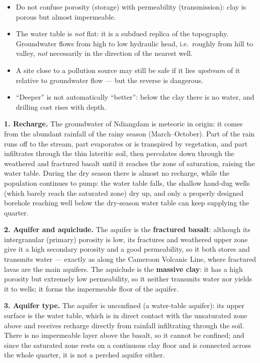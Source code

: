 \documentclass[11pt]{article}
\newcommand{\cle}[1]{{\popxbold\color{popdark}#1}}
\newcounter{popsec}
\newcounter{popsub}
\newcommand{\courssub}[1]{%
  \stepcounter{popsub}%
  \par\vspace{9pt}\noindent{\popxbold\fontsize{11.5}{13}\selectfont\color{popink}{\color{poporange}\thepopsec.\thepopsub}\hspace{6pt}#1}\par\nopagebreak\vspace{4pt}
}
\begin{document}
\begin{attention}
\begin{itemize}
\item Do not confuse \cle{porosity} (storage) with \cle{permeability} (transmission): clay is porous but almost impermeable.
\item The water table is \emph{not} flat: it is a subdued replica of the topography. Groundwater flows from high to low hydraulic head, i.e.\ roughly from hill to valley, \emph{not} necessarily in the direction of the nearest well.
\item A site close to a pollution source may still be safe if it lies \emph{upstream} of it relative to groundwater flow --- but the reverse is dangerous.
\item ``Deeper'' is not automatically ``better'': below the clay there is no water, and drilling cost rises with depth.
\end{itemize}
\end{attention}

\courssub{Model answer}

\textbf{1. Recharge.} The groundwater of Ndiangdam is meteoric in origin: it comes from the abundant rainfall of the rainy season (March--October). Part of the rain runs off to the stream, part evaporates or is transpired by vegetation, and part \cle{infiltrates} through the thin lateritic soil, then \cle{percolates} down through the weathered and fractured basalt until it reaches the zone of saturation, raising the water table. During the dry season there is almost no recharge, while the population continues to pump: the water table falls, the shallow hand-dug wells (which barely reach the saturated zone) dry up, and only a properly designed borehole reaching well below the dry-season water table can keep supplying the quarter.

\textbf{2. Aquifer and aquiclude.} The \cle{aquifer} is the \textbf{fractured basalt}: although its intergranular (primary) porosity is low, its fractures and weathered upper zone give it a high \cle{secondary porosity} and a good \cle{permeability}, so it both stores and transmits water --- exactly as along the Cameroon Volcanic Line, where fractured lavas are the main aquifers. The \cle{aquiclude} is the \textbf{massive clay}: it has a high porosity but extremely low permeability, so it neither transmits water nor yields it to wells; it forms the impermeable floor of the aquifer.

\textbf{3. Aquifer type.} The aquifer is \cle{unconfined} (a water-table aquifer): its upper surface is the water table, which is in direct contact with the unsaturated zone above and receives recharge directly from rainfall infiltrating through the soil. There is no impermeable layer above the basalt, so it cannot be confined; and since the saturated zone rests on a continuous clay floor and is connected across the whole quarter, it is not a perched aquifer either.
\end{document}
